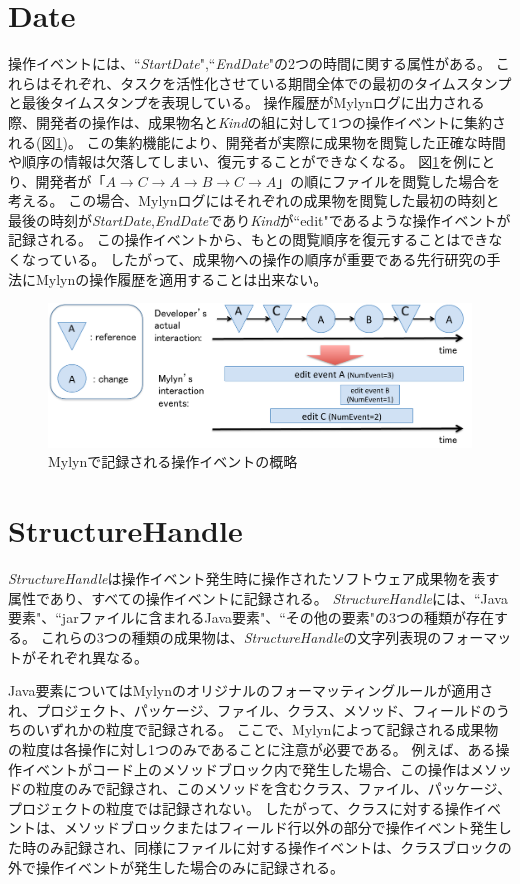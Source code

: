\documentclass[a4paper]{jsbook}
\def\ra{\rightarrow}
\begin{document}
\section{Date}\label{date_sec}
操作イベントには、``{\it StartDate}",``{\it EndDate}"の2つの時間に関する属性がある。
これらはそれぞれ、タスクを活性化させている期間全体での最初のタイムスタンプと最後タイムスタンプを表現している。
操作履歴がMylynログに出力される際、開発者の操作は、成果物名と{\it Kind}の組に対して1つの操作イベントに集約される(図\ref{mylyn_interaction})。
この集約機能により、開発者が実際に成果物を閲覧した正確な時間や順序の情報は欠落してしまい、復元することができなくなる。
図\ref{mylyn_interaction}を例にとり、開発者が「$A\ra C \ra A \ra B \ra C \ra A$」の順にファイルを閲覧した場合を考える。
この場合、Mylynログにはそれぞれの成果物を閲覧した最初の時刻と最後の時刻が{\it StartDate},{\it EndDate}であり{\it Kind}が``edit"であるような操作イベントが記録される。
この操作イベントから、もとの閲覧順序を復元することはできなくなっている。
したがって、成果物への操作の順序が重要である先行研究\cite{6233415,KatoJapanese:2011,ss2012-76,ss2013-84,Yamamori:2016}の手法にMylynの操作履歴を適用することは出来ない。
\begin{figure}[tb]
  \centering
  \includegraphics[width = \linewidth]{resource/mylyn_interaction.pdf}
  \caption{Mylynで記録される操作イベントの概略}
  \label{mylyn_interaction}
\end{figure}
\section{StructureHandle}
{\it StructureHandle}は操作イベント発生時に操作されたソフトウェア成果物を表す属性であり、すべての操作イベントに記録される。
{\it StructureHandle}には、``Java要素"、``jarファイルに含まれるJava要素"、``その他の要素"の3つの種類が存在する。
これらの3つの種類の成果物は、{\it StructureHandle}の文字列表現のフォーマットがそれぞれ異なる。

Java要素についてはMylynのオリジナルのフォーマッティングルールが適用され、プロジェクト、パッケージ、ファイル、クラス、メソッド、フィールドのうちのいずれかの粒度で記録される。
ここで、Mylynによって記録される成果物の粒度は各操作に対し1つのみであることに注意が必要である。
例えば、ある操作イベントがコード上のメソッドブロック内で発生した場合、この操作はメソッドの粒度のみで記録され、このメソッドを含むクラス、ファイル、パッケージ、プロジェクトの粒度では記録されない。
したがって、クラスに対する操作イベントは、メソッドブロックまたはフィールド行以外の部分で操作イベント発生した時のみ記録され、同様にファイルに対する操作イベントは、クラスブロックの外で操作イベントが発生した場合のみに記録される。
\end{document}
